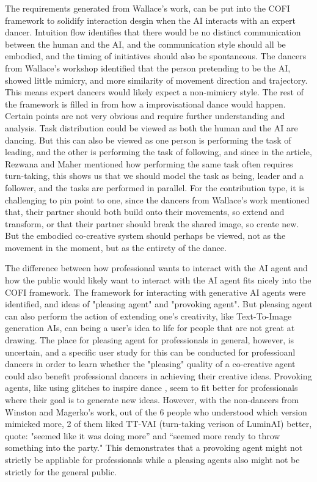 \documentclass[final,5p,times,twocolumn,authoryear]{article}
\begin{document}
The requirements generated from Wallace's work, can be put into the COFI
framework to solidify interaction desgin when the AI interacts with an
expert dancer. Intuition flow identifies that there would be no distinct
communication between the human and the AI, and the communication style
should all be embodied, and the timing of initiatives should also be
spontaneous. The dancers from Wallace's workshop identified that the
person pretending to be the AI, showed little mimicry, and more
similarity of movement direction and trajectory. This means expert
dancers would likely expect a non-mimicry style. The rest of the
framework is filled in from how a improvisational dance would happen.
Certain points are not very obvious and require further understanding
and analysis. Task distribution could be viewed as both the human and
the AI are dancing. But this can also be viewed as one person is
performing the task of leading, and the other is performing the task of
following, and since in the article, Rezwana and Maher mentioned how
performing the same task often requires turn-taking, this shows us that
we should model the task as being, leader and a follower, and the tasks
are performed in parallel. For the contribution type, it is challenging
to pin point to one, since the dancers from Wallace's work mentioned
that, their partner should both build onto their movements, so extend
and transform, or that their partner should break the shared image, so
create new. But the embodied co-creative system should perhaps be
viewed, not as the movement in the moment, but as the entirety of the
dance.

The difference between how professional wants to interact with the AI
agent and how the public would likely want to interact with the AI agent
fits nicely into the COFI framework. The framework for interacting with
generative AI agents were identified, and ideas of "pleasing agent" and
"provoking agent". But pleasing agent can also perform the action of
extending one's creativity, like Text-To-Image generation AIs, can being
a user's idea to life for people that are not great at drawing. The
place for pleasing agent for professionals in general, however, is
uncertain, and a specific user study for this can be conducted for
professioanl dancers in order to learn whether the "pleasing" quality of
a co-creative agent could also benefit professional dancers in achieving
their creative ideas. Provoking agents, like using glitches to inspire
dance \cite{Wallace2023}, seem to fit better for professionals where
their goal is to generate new ideas. However, with the non-dancers from
Winston and Magerko's work, out of the 6 people who understood which
version mimicked more, 2 of them liked TT-VAI (turn-taking verison
of LuminAI) better, quote: "seemed like it was doing more” and “seemed
more ready to throw something into the party." This demonstrates that
a provoking agent might not strictly be appliable for professionals
while a pleasing agents also might not be strictly for the general public.
\end{document}
